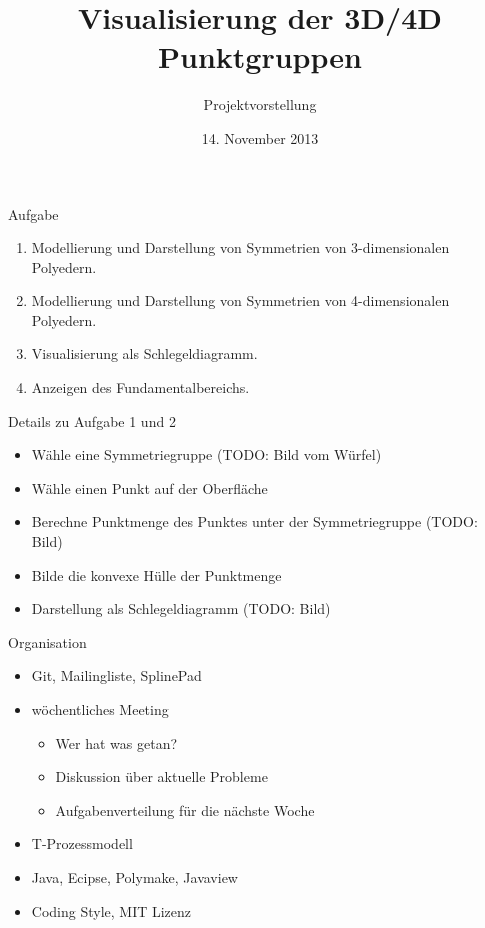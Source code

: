 \documentclass[ucs,11pt]{beamer}
\title[Punktgruppen]{Visualisierung der 3D/4D Punktgruppen}
\subtitle{Projektvorstellung}
\institute[FU Berlin]{Freie Universität Berlin}
\date[14.11.2013]{14. November 2013}
\begin{document}
\begin{frame}[plain]
	\titlepage
\end{frame}

\begin{frame}{Aufgabe}
	\begin{enumerate}
	\item Modellierung und Darstellung von Symmetrien von 3-dimensionalen Polyedern. 
	\item Modellierung und Darstellung von Symmetrien von 4-dimensionalen Polyedern. 
	\item Visualisierung als Schlegeldiagramm.
	\item Anzeigen des Fundamentalbereichs.
	\end{enumerate}
\end{frame}


\begin{frame}{Details zu Aufgabe 1 und 2}
	\begin{itemize}
	\item Wähle eine Symmetriegruppe (TODO: Bild vom Würfel)
	\item Wähle einen Punkt auf der Oberfläche
	\item Berechne Punktmenge des Punktes unter der Symmetriegruppe (TODO: Bild)
	\item Bilde die konvexe Hülle der Punktmenge
	\item Darstellung als Schlegeldiagramm (TODO: Bild)	
	\end{itemize}
\end{frame}

\begin{frame}{Organisation}
  	\begin{itemize}
   	 \item Git, Mailingliste, SplinePad
    	\item wöchentliches Meeting
		\begin{itemize}
		\item Wer hat was getan?
		\item Diskussion über aktuelle Probleme
		\item Aufgabenverteilung für die nächste Woche
		\end{itemize}
    	\item T-Prozessmodell
    	\item Java, Ecipse, Polymake, Javaview
	\item Coding Style, MIT Lizenz
  	\end{itemize}
\end{frame}
\end{document}
